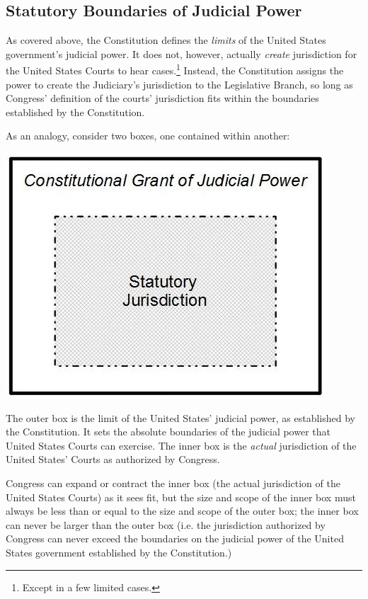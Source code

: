 \subsection{Statutory Boundaries of Judicial Power}

As covered above, the Constitution defines the \textit{limits} of the United States government's judicial power.  It does not, however, actually \textit{create} jurisdiction for the United States Courts to hear cases.\footnote{Except in a few limited cases.}
Instead, the Constitution assigns the power to create the Judiciary's jurisdiction to the Legislative Branch, so long as Congress' definition of the courts' jurisdiction fits within the boundaries established by the Constitution.

As an analogy, consider two boxes, one contained within another:

\begin{center}
\includegraphics[scale=0.5]{jxboundaries.jpg}
\end{center}

The outer box is the limit of the United States' judicial power, as established by the Constitution.  It sets the absolute boundaries of the judicial power that United States Courts can exercise.  The inner box is the \textit{actual} jurisdiction of the United States' Courts as authorized by Congress.  

Congress can expand or contract the inner box (the actual jurisdiction of the United States Courts) as it sees fit, but the size and scope of the inner box must always be less than or equal to the size and scope of the outer box; the inner box can never be larger than the outer box (i.e. the jurisdiction authorized by Congress can never exceed the boundaries on the judicial power of the United States government established by the Constitution.)


